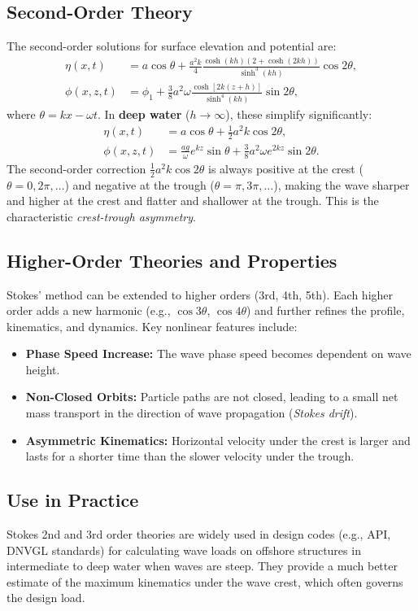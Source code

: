 \documentclass[11pt,letterpaper]{article}
\begin{document}
\subsection{Second-Order Theory}
The second-order solutions for surface elevation and potential are:
\begin{align}
\eta(x,t) &= a \cos\theta + \frac{a^2 k}{4} \frac{\cosh(kh)(2 + \cosh(2kh))}{\sinh^3(kh)} \cos 2\theta, \\
\phi(x,z,t) &= \phi_1 + \frac{3}{8} a^2 \omega \frac{\cosh[2k(z+h)]}{\sinh^4(kh)} \sin 2\theta,
\end{align}
where $\theta = kx - \omega t$. In \textbf{deep water} ($h \to \infty$), these simplify significantly:
\begin{align}
\eta(x,t) &= a \cos\theta + \frac{1}{2} a^2 k \cos 2\theta, \\
\phi(x,z,t) &= \frac{a g}{\omega} e^{kz} \sin\theta + \frac{3}{8} a^2 \omega e^{2kz} \sin 2\theta.
\end{align}
The second-order correction $\frac{1}{2} a^2 k \cos 2\theta$ is always positive at the crest ($\theta=0, 2\pi, \dots$) and negative at the trough ($\theta=\pi, 3\pi, \dots$), making the wave sharper and higher at the crest and flatter and shallower at the trough. This is the characteristic \emph{crest-trough asymmetry}.

\subsection{Higher-Order Theories and Properties}
Stokes' method can be extended to higher orders (3rd, 4th, 5th). Each higher order adds a new harmonic (e.g., $\cos 3\theta$, $\cos 4\theta$) and further refines the profile, kinematics, and dynamics. Key nonlinear features include:
\begin{itemize}
    \item \textbf{Phase Speed Increase:} The wave phase speed becomes dependent on wave height.
    \item \textbf{Non-Closed Orbits:} Particle paths are not closed, leading to a small net mass transport in the direction of wave propagation (\emph{Stokes drift}).
    \item \textbf{Asymmetric Kinematics:} Horizontal velocity under the crest is larger and lasts for a shorter time than the slower velocity under the trough.
\end{itemize}

\subsection{Use in Practice}
Stokes 2nd and 3rd order theories are widely used in design codes (e.g., API, DNVGL standards) for calculating wave loads on offshore structures in intermediate to deep water when waves are steep. They provide a much better estimate of the maximum kinematics under the wave crest, which often governs the design load.
\end{document}
